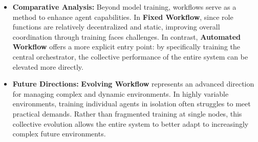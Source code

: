 \begin{tcolorbox}[takeaway,title={Takeaway 6.2}]
\begin{itemize}
\item \textbf{Comparative Analysis:} Beyond model training, workflows serve as a method to enhance agent capabilities. In \textbf{Fixed Workflow}, since role functions are relatively decentralized and static, improving overall coordination through training faces challenges. In contrast, \textbf{Automated Workflow} offers a more explicit entry point: by specifically training the central orchestrator, the collective performance of the entire system can be elevated more directly.  

\item \textbf{Future Directions:} \textbf{Evolving Workflow} represents an advanced direction for managing complex and dynamic environments. In highly variable environments, training individual agents in isolation often struggles to meet practical demands. Rather than fragmented training at single nodes, this collective evolution allows the entire system to better adapt to increasingly complex future environments.
\end{itemize}
\end{tcolorbox}



